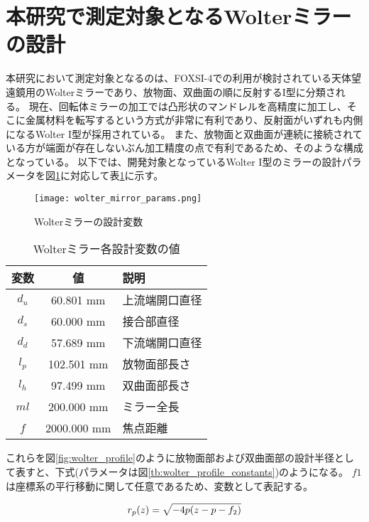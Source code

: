 \section{本研究で測定対象となるWolterミラーの設計}
本研究において測定対象となるのは、FOXSI-4での利用が検討されている天体望遠鏡用のWolterミラーであり、放物面、双曲面の順に反射するI型に分類される。
現在、回転体ミラーの加工では凸形状のマンドレルを高精度に加工し、そこに金属材料を転写するという方式が非常に有利であり、反射面がいずれも内側になるWolter I型が採用されている。
また、放物面と双曲面が連続に接続されている方が端面が存在しないぶん加工精度の点で有利であるため、そのような構成となっている。
以下では、開発対象となっているWolter I型のミラーの設計パラメータを図\ref{fig:wolter_params}に対応して表\ref{tb:wolter_params}に示す。

\begin{figure}[h!]
\centering
\texttt{[image: wolter\_mirror\_params.png]}
\caption{Wolterミラーの設計変数}
\label{fig:wolter_params}
\end{figure}

\begin{table}[ht]
\begin{center}
  \begin{tabular}{|c|c|l|} \hline
    変数 & 値 & 説明 \\ \hline
    $d_u$ & 60.801 mm & 上流端開口直径 \\
    $d_s$ & 60.000 mm & 接合部直径 \\
    $d_d$ & 57.689 mm & 下流端開口直径 \\
    $l_p$ & 102.501 mm & 放物面部長さ \\
    $l_h$ & 97.499 mm & 双曲面部長さ \\
    $ml$ & 200.000 mm & ミラー全長 \\
    $f$ & 2000.000 mm & 焦点距離 \\ \hline
  \end{tabular}
  \caption{Wolterミラー各設計変数の値}
  \label{tb:wolter_params}
\end{center}
\end{table}

これらを図\ref{fig:wolter_profile}のように放物面部および双曲面部の設計半径として表すと、下式(パラメータは図\ref{tb:wolter_profile_constants})のようになる。
$f1$は座標系の平行移動に関して任意であるため、変数として表記する。

\begin{equation}
    r_p(z) = \sqrt{ -4p(z - p - f_2) } \\
\end{equation}

